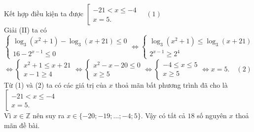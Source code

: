 \begin{ex}
{	Kết hợp điều kiện ta được $\left[\begin{array}{l} -21 < x \leq -4 \\ x=5 .
	\end{array} \right. \quad (1)$\\
	Giải  (II) ta có
	$\begin{cases} \log_3 (x^2+1)-\log_3 (x+21) \leq 0 \\ 16-2^{x-1} \leq 0
	\end{cases} \Leftrightarrow \begin{cases} \log_3 (x^2+1)\leq\log_3 (x+21) \\ 2^{x-1} \geq 2^4
	\end{cases}$\\
	$\Leftrightarrow \begin{cases} x^2+1\leq x+21 \\ x-1\geq 4
	\end{cases} \Leftrightarrow \begin{cases} x^2-x-20\leq 0 \\ x\geq 5
	\end{cases} \Leftrightarrow \begin{cases} -4 \leq x \leq 5 \\ x\geq 5
	\end{cases} \Leftrightarrow x=5. \quad (2)$\\
	Từ (1) và (2) ta có các giá trị của $x$ thoả mãn bất phương trình đã cho là $\left[\begin{array}{l} -21 < x \leq -4 \\ x=5.
	\end{array} \right.$\\
	Vì $x \in  \mathbb{Z}$ nên suy ra $x \in \{-20;-19;\ldots;-4;5\}$. Vậy có tất cả $18$ số nguyên $x$ thoả mãn đề bài.
} 
\end{ex}


